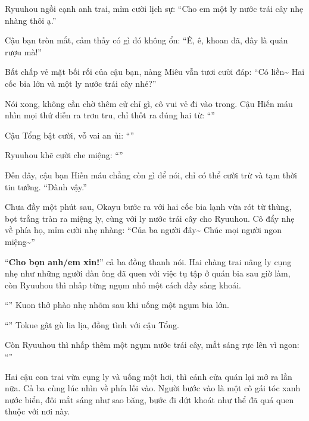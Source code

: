 \documentclass[../main.tex]{subfiles}
\begin{document}
Ryuuhou ngồi cạnh anh trai, mỉm cười lịch sự: ``Cho em một ly nước trái cây nhẹ nhàng thôi ạ.''

Cậu bạn tròn mắt, cảm thấy có gì đó không ổn: ``Ê, ê, khoan đã, đây là quán rượu mà!''

Bất chấp vẻ mặt bối rối của cậu bạn, nàng Miêu vẫn tươi cười đáp: ``Có liền\~{} Hai cốc bia lớn và một ly nước trái cây nhé?''

Nói xong, không cần chờ thêm cử chỉ gì, cô vui vẻ đi vào trong. Cậu Hiến máu nhìn mọi thứ diễn ra trơn tru, chỉ thốt ra đúng hai từ: ``''

Cậu Tổng bật cười, vỗ vai an ủi: ``''

Ryuuhou khẽ cười che miệng: ``''

Đến đây, cậu bạn Hiến máu chẳng còn gì để nói, chỉ có thể cười trừ và tạm thời tin tưởng. ``Đành vậy.''

Chưa đầy một phút sau, Okayu bước ra với hai cốc bia lạnh vừa rót từ thùng, bọt trắng tràn ra miệng ly, cùng với ly nước trái cây cho Ryuuhou. Cô đẩy nhẹ về phía họ, mỉm cười nhẹ nhàng: ``Của ba người đây\~{} Chúc mọi người ngon miệng\~{}''

``\textbf{Cho bọn anh/em xin!}'' cả ba đồng thanh nói. Hai chàng trai nâng ly cụng nhẹ như những người đàn ông đã quen với việc tụ tập ở quán bia sau giờ làm, còn Ryuuhou thì nhấp từng ngụm nhỏ một cách đầy sảng khoái.

``'' Kuon thở phào nhẹ nhõm sau khi uống một ngụm bia lớn.

``'' Tokue gật gù lia lịa, đồng tình với cậu Tổng.

Còn Ryuuhou thì nhấp thêm một ngụm nước trái cây, mắt sáng rực lên vì ngon: ``''

Hai cậu con trai vừa cụng ly và uống một hơi, thì cánh cửa quán lại mở ra lần nữa. Cả ba cùng lúc nhìn về phía lối vào. Người bước vào là một cô gái tóc xanh nước biển, đôi mắt sáng như sao băng, bước đi dứt khoát như thể đã quá quen thuộc với nơi này.
\end{document}
